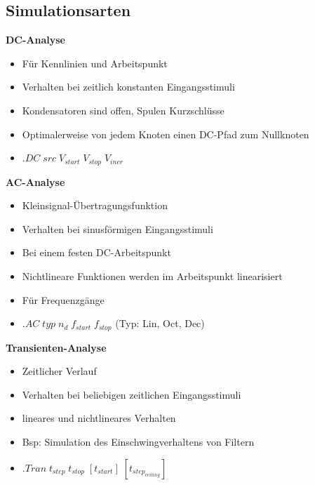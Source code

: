 	\subsection{Simulationsarten}
	\begin{multicols}{2}
			{\bf DC-Analyse}
			\begin{itemize}
				\item Für Kennlinien und Arbeitspunkt
				\item Verhalten bei zeitlich konstanten Eingangsstimuli
				\item Kondensatoren sind offen, Spulen Kurzschlüsse
				\item Optimalerweise von jedem Knoten einen DC-Pfad zum Nullknoten
				\item $.DC \; src \; V_{start} \; V_{stop} \; V_{incr}$
			\end{itemize}
			{\bf AC-Analyse}
			\begin{itemize}
				\item Kleinsignal-Übertragungsfunktion
				\item Verhalten bei sinusförmigen Eingangsstimuli
				\item Bei einem festen DC-Arbeitspunkt
				\item Nichtlineare Funktionen werden im Arbeitspunkt linearisiert
				\item Für Frequenzgänge
				\item $.AC \; typ \; n_d \; f_{start} \; f_{stop}$ (Typ: Lin, Oct, Dec)
			\end{itemize}
	\columnbreak
			{\bf Transienten-Analyse}
			\begin{itemize}
				\item Zeitlicher Verlauf
				\item Verhalten bei beliebigen zeitlichen Eingangsstimuli
				\item lineares und nichtlineares Verhalten
				\item Bsp: Simulation des Einschwingverhaltens von Filtern
				\item $.Tran \; t_{step} \; t_{stop} \; [t_{start}] \; [t_{step_{ceiling}}]$
			\end{itemize}
	\end{multicols}